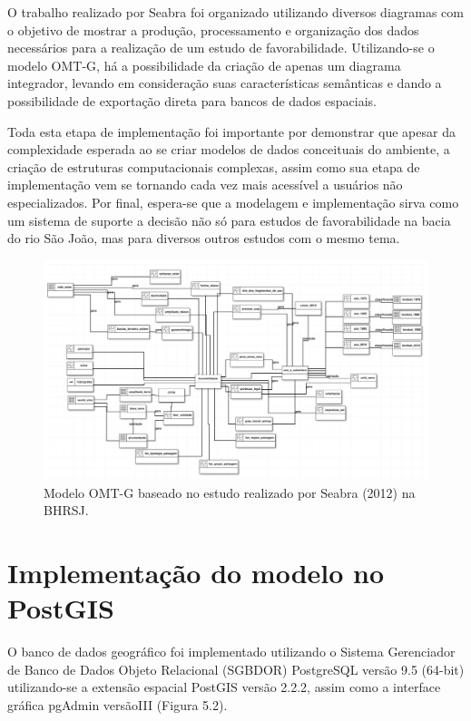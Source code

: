 O trabalho realizado por Seabra foi organizado utilizando diversos diagramas com o objetivo de mostrar a produção, processamento e organização dos dados necessários para a realização de um estudo de favorabilidade. Utilizando-se o modelo OMT-G, há a possibilidade da criação de apenas um diagrama integrador, levando em consideração suas características semânticas e dando a possibilidade de exportação direta para bancos de dados espaciais.

Toda esta etapa de implementação foi importante por demonstrar que apesar da complexidade esperada ao se criar modelos de dados conceituais do ambiente, a criação de estruturas computacionais complexas, assim como sua etapa de implementação vem se tornando cada vez mais acessível a usuários não especializados.  Por final, espera-se que a modelagem e implementação sirva como um sistema de suporte a decisão não só para estudos de favorabilidade na bacia do rio São João, mas para diversos outros estudos com o mesmo tema.

	\afterpage{\clearpage}
	\begin{figure}
		\centering
		\includegraphics[width=1\linewidth]{data/modelo_OMT-G_final}
		\caption{Modelo OMT-G baseado no estudo realizado por Seabra (2012) na BHRSJ.}
		\label{fig:modeloomt-gfinal}
	\end{figure}

\newpage
\section{Implementação do modelo no PostGIS}

O banco de dados geográfico foi implementado utilizando o Sistema Gerenciador de Banco de Dados Objeto Relacional (SGBDOR) PostgreSQL versão 9.5 (64-bit) utilizando-se a extensão espacial PostGIS versão 2.2.2, assim como a interface gráfica pgAdmin versãoIII (Figura 5.2). 

